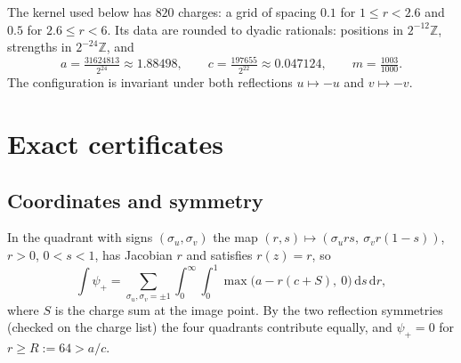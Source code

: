 \documentclass[11pt]{amsart}
\theoremstyle{definition}
\theoremstyle{remark}
\newcommand{\Z}{\mathbb{Z}}
\newcommand{\dd}{\,\mathrm{d}}
\begin{document}
The kernel used below has $820$ charges: a grid of spacing $0.1$ for $1 \le r < 2.6$ and $0.5$ for
$2.6 \le r < 6$. Its data are rounded to dyadic rationals: positions in $2^{-12}\Z$, strengths in
$2^{-24}\Z$, and
\[ a = \tfrac{31624813}{2^{24}} \approx 1.88498, \qquad c = \tfrac{197655}{2^{22}} \approx 0.047124,
\qquad m = \tfrac{1003}{1000} . \]
The configuration is invariant under both reflections $u \mapsto -u$ and $v \mapsto -v$.

\section{Exact certificates}\label{sec:cert}

\subsection*{Coordinates and symmetry}
In the quadrant with signs $(\sigma_u, \sigma_v)$ the map $(r,s) \mapsto (\sigma_u rs,\ \sigma_v r(1-s))$,
$r > 0$, $0 < s < 1$, has Jacobian $r$ and satisfies $r(z) = r$, so
\[ \int \psi_+ = \sum_{\sigma_u, \sigma_v = \pm1} \int_0^\infty \!\! \int_0^1 \max\bigl(a - r(c + S),\ 0\bigr) \dd s \dd r, \]
where $S$ is the charge sum at the image point. By the two reflection symmetries (checked on the
charge list) the four quadrants contribute equally, and $\psi_+ = 0$ for $r \ge R := 64 > a/c$.
\end{document}
